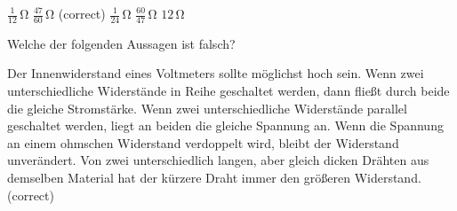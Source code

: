 \documentclass[11pt]{exam}
\begin{document}
\begin{questions}
\begin{choices}
	\choice \(\mathrm{\frac{1}{12}\,\Omega}\)
	\choice \(\mathrm{\frac{47}{60}\,\Omega}\) (correct)
	\choice \(\mathrm{\frac{1}{24}\,\Omega}\)
	\choice \(\mathrm{\frac{60}{47}\,\Omega}\)
	\choice \(\mathrm{12\,\Omega}\)
\end{choices}

\vspace{3mm}\question Welche der folgenden Aussagen ist falsch?

\begin{choices}
	\choice Der Innenwiderstand eines Voltmeters sollte möglichst hoch sein.
	\choice Wenn zwei unterschiedliche Widerstände in Reihe geschaltet werden, dann fließt durch beide die gleiche Stromstärke.
	\choice Wenn zwei unterschiedliche Widerstände parallel geschaltet werden, liegt an beiden die gleiche Spannung an.
	\choice Wenn die Spannung an einem ohmschen Widerstand verdoppelt wird, bleibt der Widerstand unverändert.
	\choice Von zwei unterschiedlich langen, aber gleich dicken Drähten aus demselben Material hat der kürzere Draht immer den größeren Widerstand. (correct)
\end{choices}

\vspace{3mm}\end{questions}
\end{document}
